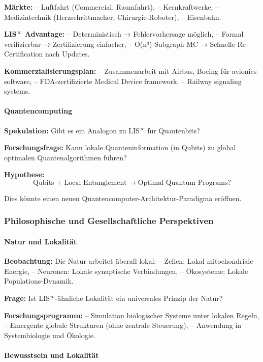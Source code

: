 \documentclass[a4paper,12pt]{article}
\theoremstyle{definition}
\begin{document}
\textbf{Märkte:}
-- Luftfahrt (Commercial, Raumfahrt),
-- Kernkraftwerke,
-- Medizintechnik (Herzschrittmacher, Chirurgie-Roboter),
-- Eisenbahn.

\textbf{LIS$^{\infty}$ Advantage:}
-- Deterministisch → Fehlervorhersage möglich,
-- Formal verifizierbar → Zertifizierung einfacher,
-- O(n³) Subgraph MC → Schnelle Re-Certification nach Updates.

\textbf{Kommerzialisierungsplan:}
-- Zusammenarbeit mit Airbus, Boeing für avionics software,
-- FDA-zertifizierte Medical Device framework,
-- Railway signaling systems.

\paragraph{Quantencomputing}

\textbf{Spekulation:} Gibt es ein Analogon zu LIS$^{\infty}$ für Quantenbits?

\textbf{Forschungsfrage:} Kann lokale Quanteninformation (in Qubits) zu global optimalen Quantenalgorithmen führen?

\textbf{Hypothese:}
\[
\text{Qubits + Local Entanglement} \to \text{Optimal Quantum Programs}?
\]

Dies könnte einen neuen Quantencomputer-Architektur-Paradigma eröffnen.

\subsubsection{Philosophische und Gesellschaftliche Perspektiven}

\paragraph{Natur und Lokalität}

\textbf{Beobachtung:} Die Natur arbeitet überall lokal:
-- Zellen: Lokal mitochondriale Energie,
-- Neuronen: Lokale synaptische Verbindungen,
-- Ökosysteme: Lokale Populations-Dynamik.

\textbf{Frage:} Ist LIS$^{\infty}$-ähnliche Lokalität ein universales Prinzip der Natur?

\textbf{Forschungsprogramm:}
-- Simulation biologischer Systeme unter lokalen Regeln,
-- Emergente globale Strukturen (ohne zentrale Steuerung),
-- Anwendung in Systembiologie und Ökologie.

\paragraph{Bewusstsein und Lokalität}
\end{document}
